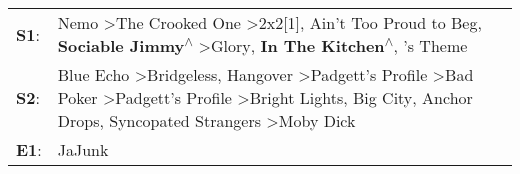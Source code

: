 \begin{supertabular}{p{0.03\textwidth}p{0.92\textwidth}}
 \textbf{S1}:  &                                                                                                          Nemo\textsuperscript{} \textgreater \enspace The Crooked One\textsuperscript{} \textgreater \enspace 2x2[1]\textsuperscript{}, \enspace Ain't Too Proud to Beg\textsuperscript{}, \enspace \textbf{Sociable Jimmy\textsuperscript{$\wedge$}} \textgreater \enspace Glory\textsuperscript{}, \enspace \textbf{In The Kitchen\textsuperscript{$\wedge$}}, 's Theme\textsuperscript{}  \enspace  \\
 \textbf{S2}:  &  Blue Echo\textsuperscript{} \textgreater \enspace Bridgeless\textsuperscript{}, \enspace Hangover\textsuperscript{} \textgreater \enspace Padgett's Profile\textsuperscript{} \textgreater \enspace Bad Poker\textsuperscript{} \textgreater \enspace Padgett's Profile\textsuperscript{} \textgreater \enspace Bright Lights, Big City\textsuperscript{}, \enspace Anchor Drops\textsuperscript{}, \enspace Syncopated Strangers\textsuperscript{} \textgreater \enspace Moby Dick\textsuperscript{}  \enspace  \\
 \textbf{E1}:  &                                                                                                                                                                                                                                                                                                                                                                                                                                                                               JaJunk\textsuperscript{}  \enspace  \\
\end{supertabular}

